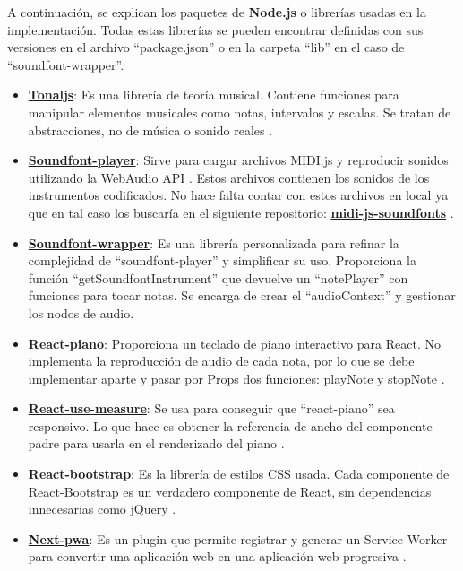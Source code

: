 \documentclass[12pt,twoside,titlepage]{report}
\begin{document}
A continuación, se explican los paquetes de \textbf{Node.js} o librerías usadas en la implementación. Todas estas librerías se pueden encontrar definidas con sus versiones en el archivo ``package.json'' o en la carpeta ``lib'' en el caso de ``soundfont-wrapper''.

\begin{itemize}
    \item \href{https://github.com/tonaljs/tonal}{\textbf{Tonaljs}}: Es una librería de teoría musical. Contiene funciones para manipular elementos musicales como notas, intervalos y escalas. Se tratan de abstracciones, no de música o sonido reales \cite{tonal}.
    \item \href{https://github.com/danigb/soundfont-player}{\textbf{Soundfont-player}}: Sirve para cargar archivos MIDI.js y reproducir sonidos utilizando la WebAudio API \cite{webAudioAPI}. Estos archivos contienen los sonidos de los instrumentos codificados. No hace falta contar con estos archivos en local ya que en tal caso los buscaría en el siguiente repositorio: \href{https://github.com/gleitz/midi-js-soundfonts}{{\textbf{midi-js-soundfonts}}} \cite{soundfont-player}.
    \item \href{https://github.com/alberttogoca/EarFit/blob/main/src/lib/soundfont-wrapper.ts}{\textbf{Soundfont-wrapper}}: Es una librería personalizada para refinar la complejidad de ``soundfont-player'' y simplificar su uso. Proporciona la función ``getSoundfontInstrument'' que devuelve un ``notePlayer'' con funciones para tocar notas. Se encarga de crear el ``audioContext'' y gestionar los nodos de audio.
    \item \href{https://github.com/kevinsqi/react-piano}{\textbf{React-piano}}: Proporciona un teclado de piano interactivo para React. No implementa la reproducción de audio de cada nota, por lo que se debe implementar aparte y pasar por Props dos funciones: playNote y stopNote \cite{react-piano}.
    \item \href{https://github.com/pmndrs/react-use-measure}{\textbf{React-use-measure}}: Se usa para conseguir que ``react-piano'' sea responsivo. Lo que hace es obtener la referencia de ancho del componente padre para usarla en el renderizado del piano \cite{react-use-measure}.
    \item \href{https://github.com/react-bootstrap/react-bootstrap}{\textbf{React-bootstrap}}: Es la librería de estilos CSS usada. Cada componente de React-Bootstrap es un verdadero componente de React, sin dependencias innecesarias como jQuery \cite{react-bootstrap}.
    \item \href{https://github.com/shadowwalker/next-pwa}{\textbf{Next-pwa}}: Es un plugin que permite registrar y generar un Service Worker para convertir una aplicación web en una aplicación web progresiva \cite{next-pwa}.
\end{itemize}
\end{document}
